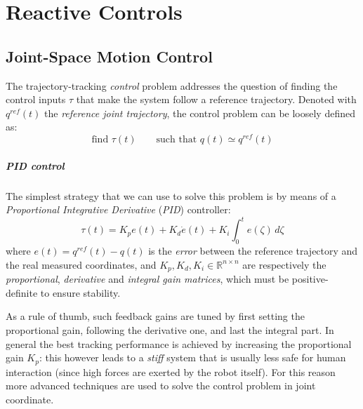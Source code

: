 \chapter{Reactive Controls}
	
\section{Joint-Space Motion Control}
	The trajectory-tracking \textit{control} problem addresses the question of finding the control inputs $\tau$ that make the system follow a reference trajectory. 
	Denoted with $q^{ref}(t)$ the \textit{reference joint trajectory}, the control problem can be loosely defined as:
	\[ \textrm{find } \tau(t) \qquad \textrm{such that } q(t) \simeq q^{ref}(t) \]
	
	\paragraph{PID control} The simplest strategy that we can use to solve this problem is by means of a \textit{Proportional Integrative Derivative} (\textit{PID}) controller:
	\begin{equation} \label{eq:PIDforce}
		\tau(t) = K_p e(t) + K_d \dot e(t) + K_i\int_0^t e(\zeta)\, d\zeta
	\end{equation}
	where $e(t) = q^{ref}(t) - q(t)$ is the \textit{error} between the reference trajectory and the real measured coordinates, and $K_p,K_d,K_i \in \mathds R^{n\times n}$ are respectively the \textit{proportional}, \textit{derivative} and \textit{integral gain matrices}, which must be positive-definite to ensure stability.
	
	As a rule of thumb, such feedback gains are tuned by first setting the proportional gain, following the derivative one, and last the integral part. In general the best tracking performance is achieved by increasing the proportional gain $K_p$: this however leads to a \textit{stiff} system that is usually less safe for human interaction (since high forces are exerted by the robot itself). For this reason more advanced techniques are used to solve the control problem in joint coordinate.
		
